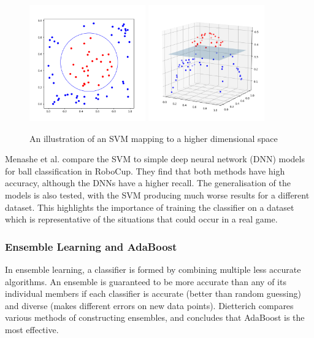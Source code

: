 \begin{figure}[H]
    \centering
    \includegraphics[width=5cm]{images/svm1.png}
    \includegraphics[width=5cm]{images/svm2.png}
    \caption{An illustration of an SVM mapping to a higher dimensional space}
    \centering
\end{figure}

Menashe et al. \cite{Menashe2017} compare the SVM to simple deep neural network (DNN) models for ball classification in RoboCup. They find that both methods have high accuracy, although the DNNs have a higher recall. The generalisation of the models is also tested, with the SVM producing much worse results for a different dataset. This highlights the importance of training the classifier on a dataset which is representative of the situations that could occur in a real game. 

\subsubsection{Ensemble Learning and AdaBoost}

In ensemble learning, a classifier is formed by combining multiple less accurate algorithms. An ensemble is guaranteed to be more accurate than any of its individual members if each classifier is accurate (better than random guessing) and diverse (makes different errors on new data points). Dietterich\cite{Dietterich2000} compares various methods of constructing ensembles, and concludes that AdaBoost is the most effective.

